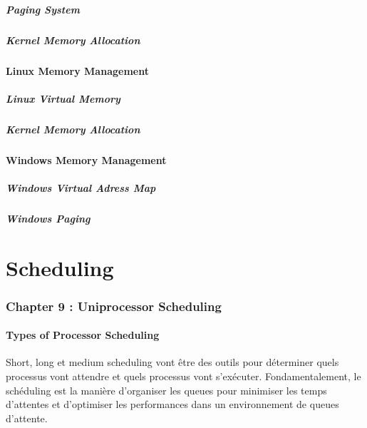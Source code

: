 \subsubsection{Paging System}
\subsubsection{Kernel Memory Allocation}
\subsection{Linux Memory Management}
\subsubsection{Linux Virtual Memory}
\subsubsection{Kernel Memory Allocation}
\subsection{Windows Memory Management}
\subsubsection{Windows Virtual Adress Map }
\subsubsection{Windows Paging}


\newpage
\part{Scheduling}


\section{Chapter 9 : Uniprocessor Scheduling}

\subsection{Types of Processor Scheduling}
Short, long et medium scheduling vont être des outils pour déterminer quels processus vont attendre et quels processus vont s'exécuter.
Fondamentalement, le schéduling est la manière d'organiser les queues pour minimiser les temps d'attentes et d'optimiser les performances dans un environnement de queues d'attente.

